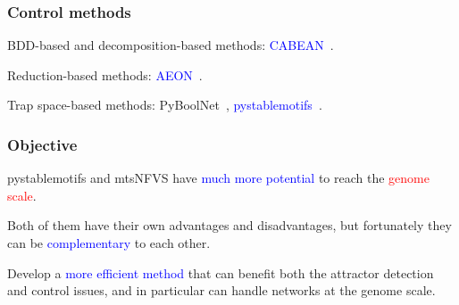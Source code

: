 \documentclass{beamer}              %
\newcommand{\blue}[1]{\textcolor{blue}{#1}}
\newcommand{\red}[1]{\textcolor{red}{#1}}
\begin{document}
\begin{frame}
  \frametitle{Control methods}

BDD-based and decomposition-based methods: \blue{CABEAN}~\cite{DBLP:journals/bioinformatics/SuP21, DBLP:conf/fm/SuP21}.

\hspace{0.8cm}

Reduction-based methods: \blue{AEON}~\cite{Brim2021}.

\hspace{0.8cm}

Trap space-based methods: PyBoolNet~\cite{cifuentes2020control, cifuentes2021control}, \blue{pystablemotifs}~\cite{Zaudo2015, rozum2021pystablemotifs}.

\end{frame}

\begin{frame}
\frametitle{Objective}

pystablemotifs and mtsNFVS have \blue{much more potential} to reach the \red{genome scale}.

\hspace{0.8cm}

Both of them have their own advantages and disadvantages, but fortunately they can be \blue{complementary} to each other.

\hspace{0.8cm}

Develop a \blue{more efficient method} that can benefit both the attractor detection and control issues, and in particular can handle networks at the genome scale.
    
\end{frame}
\end{document}
